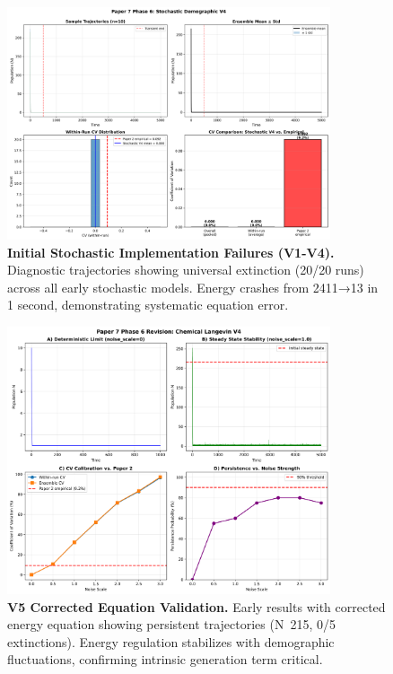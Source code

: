 \documentclass[
]{article}
\begin{document}
\begin{figure}[htbp]
\centering
\includegraphics[width=0.85\textwidth]{figures/paper7_fig16_stochastic_failures.png}
\caption{\textbf{Initial Stochastic Implementation Failures (V1-V4).} Diagnostic trajectories showing universal extinction (20/20 runs) across all early stochastic models. Energy crashes from 2411→13 in 1 second, demonstrating systematic equation error.}
\label{fig:stochastic-failures}
\end{figure}

\begin{figure}[htbp]
\centering
\includegraphics[width=0.85\textwidth]{figures/paper7_fig17_v5_early.png}
\caption{\textbf{V5 Corrected Equation Validation.} Early results with corrected energy equation showing persistent trajectories (N~215, 0/5 extinctions). Energy regulation stabilizes with demographic fluctuations, confirming intrinsic generation term critical.}
\label{fig:v5-early}
\end{figure}
\end{document}
